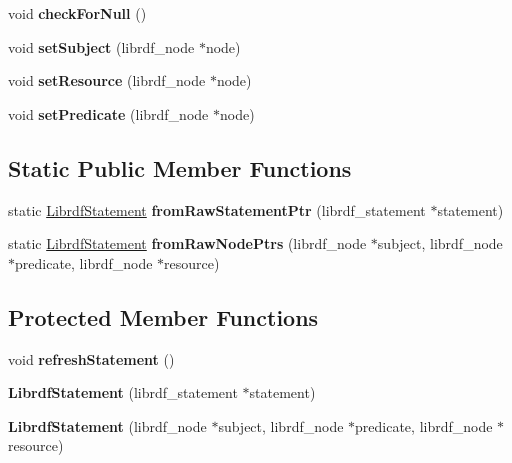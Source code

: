 \begin{DoxyCompactItemize}
\mbox{\label{classredland_1_1LibrdfStatement_a700219b2fed175a96fecfbd905d20ab1}} 
void {\bfseries check\+For\+Null} ()
\item 
\mbox{\label{classredland_1_1LibrdfStatement_a5fa27f77859a4673e991b9e86f84d889}} 
void {\bfseries set\+Subject} (librdf\+\_\+node $\ast$node)
\item 
\mbox{\label{classredland_1_1LibrdfStatement_a8b8fd2999e80bd2912af2430503a557a}} 
void {\bfseries set\+Resource} (librdf\+\_\+node $\ast$node)
\item 
\mbox{\label{classredland_1_1LibrdfStatement_a3306876fb080f3d19fca806142f93f87}} 
void {\bfseries set\+Predicate} (librdf\+\_\+node $\ast$node)
\end{DoxyCompactItemize}
\subsection*{Static Public Member Functions}
\begin{DoxyCompactItemize}
\item 
\mbox{\label{classredland_1_1LibrdfStatement_a9fb66c801d731ffce13e4d1381c49c29}} 
static \hyperlink{classredland_1_1LibrdfStatement}{Librdf\+Statement} {\bfseries from\+Raw\+Statement\+Ptr} (librdf\+\_\+statement $\ast$statement)
\item 
\mbox{\label{classredland_1_1LibrdfStatement_a4eceaebc10deea27f4c75f7c8b4cccaf}} 
static \hyperlink{classredland_1_1LibrdfStatement}{Librdf\+Statement} {\bfseries from\+Raw\+Node\+Ptrs} (librdf\+\_\+node $\ast$subject, librdf\+\_\+node $\ast$predicate, librdf\+\_\+node $\ast$resource)
\end{DoxyCompactItemize}
\subsection*{Protected Member Functions}
\begin{DoxyCompactItemize}
\item 
\mbox{\label{classredland_1_1LibrdfStatement_afd63d6425b2130dbe4e76fdee4d7218b}} 
void {\bfseries refresh\+Statement} ()
\item 
\mbox{\label{classredland_1_1LibrdfStatement_a4cbbbf99d094cea4569324a8c67789fb}} 
{\bfseries Librdf\+Statement} (librdf\+\_\+statement $\ast$statement)
\item 
\mbox{\label{classredland_1_1LibrdfStatement_ac1b38e67ff0b90ac54b27c4f5f5d9e12}} 
{\bfseries Librdf\+Statement} (librdf\+\_\+node $\ast$subject, librdf\+\_\+node $\ast$predicate, librdf\+\_\+node $\ast$resource)
\end{DoxyCompactItemize}
